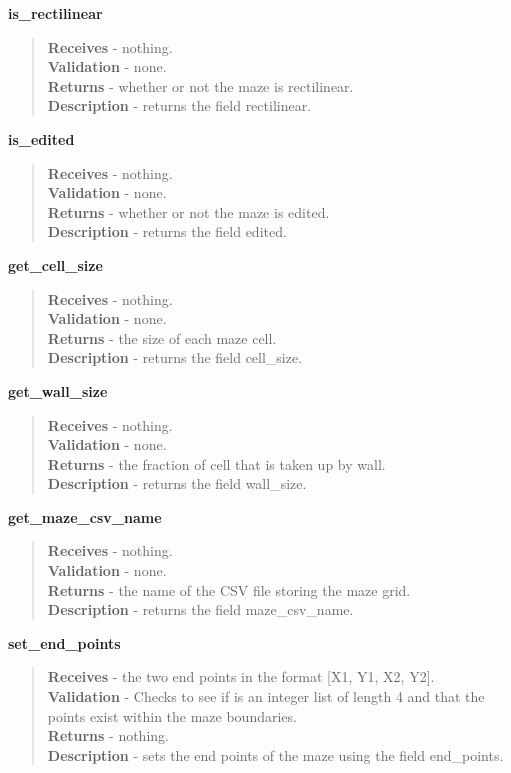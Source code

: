 \documentclass[titlepage]{article}
\begin{document}
\textbf{is\_rectilinear}
\begin{quote}
\textbf{Receives} - nothing.
\\
\textbf{Validation} - none.\\
\textbf{Returns} - whether or not the maze is rectilinear.
\\
\textbf{Description} - returns the field rectilinear.
\end{quote}

\textbf{is\_edited}
\begin{quote}
\textbf{Receives} - nothing.
\\
\textbf{Validation} - none.\\
\textbf{Returns} - whether or not the maze is edited.
\\
\textbf{Description} - returns the field edited.
\end{quote}

\textbf{get\_cell\_size}
\begin{quote}
\textbf{Receives} - nothing.
\\
\textbf{Validation} - none.\\
\textbf{Returns} - the size of each maze cell.
\\
\textbf{Description} - returns the field cell\_size.
\end{quote}

\textbf{get\_wall\_size}
\begin{quote}
\textbf{Receives} - nothing.
\\
\textbf{Validation} - none.\\
\textbf{Returns} - the fraction of cell that is taken up by wall.
\\
\textbf{Description} - returns the field wall\_size.
\end{quote}

\textbf{get\_maze\_csv\_name}
\begin{quote}
\textbf{Receives} - nothing.
\\
\textbf{Validation} - none.\\
\textbf{Returns} - the name of the CSV file storing the maze grid.
\\
\textbf{Description} - returns the field maze\_csv\_name.
\end{quote}

\textbf{set\_end\_points}
\begin{quote}
\textbf{Receives} - the two end points in the format [X1, Y1, X2, Y2].
\\
\textbf{Validation} - Checks to see if is an integer list of length 4 and that the points exist within the maze boundaries.\\
\textbf{Returns} - nothing.
\\
\textbf{Description} - sets the end points of the maze using the field end\_points.
\end{quote}
\end{document}
